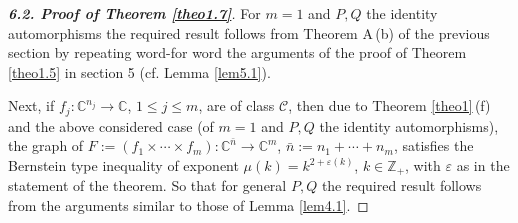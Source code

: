 \documentclass[11pt, oneside]{amsart}
\begin{document}
\begin{proof}[{\bf 6.2. Proof of Theorem \ref{theo1.7}}]
For $m=1$ and $P,Q$ the identity automorphisms the required result follows from Theorem A\,(b) of  the previous section by repeating word-for word the arguments of the proof of Theorem \ref{theo1.5} in section 5 (cf. Lemma \ref{lem5.1}).

Next, if $f_j:\mathbb C^{n_j}\rightarrow\mathbb C$, $1\le j\le m$, are of class $\mathscr C$, then due to Theorem \ref{theo1}\,(f) and the above considered case (of $m=1$ and $P,Q$ the identity automorphisms), the graph of $F:=(f_1\times\cdots\times f_m):\mathbb C^{\bar n}\rightarrow\mathbb C^{m}$, $\bar n:=n_1+\cdots +n_m$, satisfies the Bernstein type inequality of exponent $\mu(k)=k^{2+\varepsilon(k)}$, $k\in\mathbb Z_+$, with $\varepsilon$ as in the statement of the theorem. So that for general $P,Q$ the required result follows from the arguments similar to those of Lemma \ref{lem4.1}. 


\end{proof}
\end{document}
